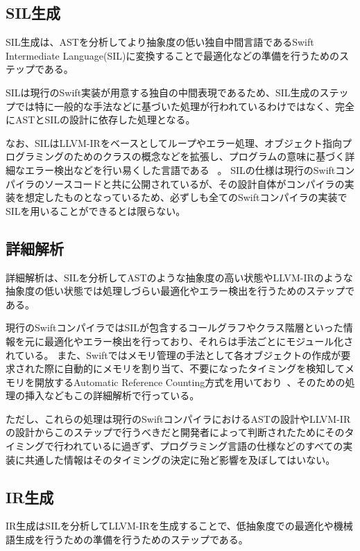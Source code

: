 \subsection{SIL生成}

SIL生成は、ASTを分析してより抽象度の低い独自中間言語であるSwift Intermediate Language(SIL)に変換することで最適化などの準備を行うためのステップである。

SILは現行のSwift実装が用意する独自の中間表現であるため、SIL生成のステップでは特に一般的な手法などに基づいた処理が行われているわけではなく、完全にASTとSILの設計に依存した処理となる。

なお、SILはLLVM-IRをベースとしてループやエラー処理、オブジェクト指向プログラミングのためのクラスの概念などを拡張し、プログラムの意味に基づく詳細なエラー検出などを行い易くした言語である ~\cite{sil}。
SILの仕様は現行のSwiftコンパイラのソースコードと共に公開されているが、その設計自体がコンパイラの実装を想定したものとなっているため、必ずしも全てのSwiftコンパイラの実装でSILを用いることができるとは限らない。

\subsection{詳細解析}
\label{refinement:structure:analyze}

詳細解析は、SILを分析してASTのような抽象度の高い状態やLLVM-IRのような抽象度の低い状態では処理しづらい最適化やエラー検出を行うためのステップである。

現行のSwiftコンパイラではSILが包含するコールグラフやクラス階層といった情報を元に最適化やエラー検出を行っており、それらは手法ごとにモジュール化されている。
また、Swiftではメモリ管理の手法として各オブジェクトの作成が要求された際に自動的にメモリを割り当て、不要になったタイミングを検知してメモリを開放するAutomatic Reference Counting方式を用いており~\cite{arc}、そのための処理の挿入などもこの詳細解析で行っている。

ただし、これらの処理は現行のSwiftコンパイラにおけるASTの設計やLLVM-IRの設計からこのステップで行うべきだと開発者によって判断されたためにそのタイミングで行われているに過ぎず、プログラミング言語の仕様などのすべての実装に共通した情報はそのタイミングの決定に殆ど影響を及ぼしてはいない。

\subsection{IR生成}

IR生成はSILを分析してLLVM-IRを生成することで、低抽象度での最適化や機械語生成を行うための準備を行うためのステップである。

